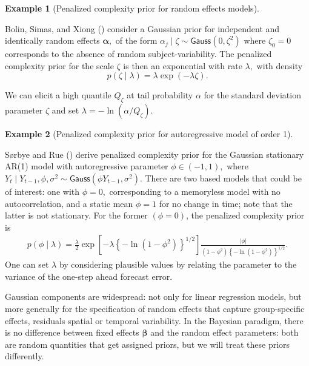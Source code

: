 \documentclass[
  11pt,
  letterpaper,
]{scrbook}
\theoremstyle{definition}
\theoremstyle{plain}
\theoremstyle{plain}
\theoremstyle{definition}
\theoremstyle{definition}
\newtheorem{example}{Example}[chapter]
\theoremstyle{remark}
\begin{document}
\begin{example}[Penalized complexity prior for random effects
models]\protect\hypertarget{exm-pcprior-randomeffect}{}\label{exm-pcprior-randomeffect}

Bolin, Simas, and Xiong () consider a
Gaussian prior for independent and identically random effects
\(\boldsymbol{\alpha},\) of the form
\(\alpha_j \mid \zeta \sim \mathsf{Gauss}(0, \zeta^2)\) where
\(\zeta_0=0\) corresponds to the absence of random subject-variability.
The penalized complexity prior for the scale \(\zeta\) is then an
exponential with rate \(\lambda,\) with density
\[p(\zeta \mid \lambda) = \lambda \exp(-\lambda \zeta).\]

We can elicit a high quantile \(Q_\zeta\) at tail probability \(\alpha\)
for the standard deviation parameter \(\zeta\) and set
\(\lambda = -\ln(\alpha/Q_\zeta)\).

\end{example}

\begin{example}[Penalized complexity prior for autoregressive model of
order
1]\protect\hypertarget{exm-pcprior-arorder}{}\label{exm-pcprior-arorder}

Sørbye and Rue () derive
penalized complexity prior for the Gaussian stationary AR(1) model with
autoregressive parameter \(\phi \in (-1,1),\) where
\(Y_t \mid Y_{t-1}, \phi, \sigma^2 \sim \mathsf{Gauss}(\phi Y_{t-1}, \sigma^2).\)
There are two based models that could be of interest: one with
\(\phi=0,\) corresponding to a memoryless model with no autocorrelation,
and a static mean \(\phi=1\) for no change in time; note that the latter
is not stationary. For the former \((\phi=0)\), the penalized complexity
prior is \begin{align*}
p(\phi \mid \lambda) = \frac{\lambda}{2} \exp\left[-\lambda \left\{-\ln(1-\phi^2)\right\}^{1/2}\right] \frac{|\phi|}{(1-\phi^2)\left\{-\ln(1-\phi^2)\right\}^{1/2}}.
\end{align*} One can set \(\lambda\) by considering plausible values by
relating the parameter to the variance of the one-step ahead forecast
error.

\end{example}

Gaussian components are widespread: not only for linear regression
models, but more generally for the specification of random effects that
capture group-specific effects, residuals spatial or temporal
variability. In the Bayesian paradigm, there is no difference between
fixed effects \(\boldsymbol{\beta}\) and the random effect parameters:
both are random quantities that get assigned priors, but we will treat
these priors differently.
\end{document}
